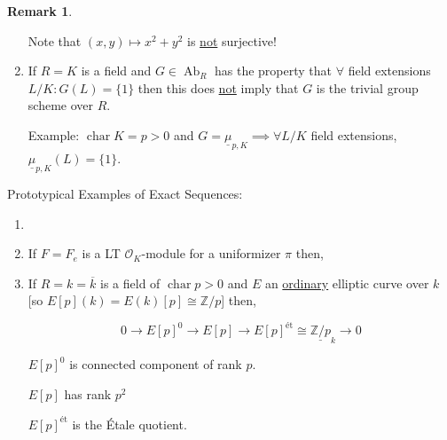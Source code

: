 \documentclass{article}
\theoremstyle{definition}
\numberwithin{theorem}{subsection}
\newtheorem*{remark}{Remark}
\begin{document}
\begin{remark}
\begin{enumerate}[label=\arabic*)]
            Note that \((x,y) \mapsto x^2 + y^2\) is \underline{not} surjective!

            \item If \(R = K\) is a field and \(G \in \operatorname{Ab}_R\) has the property that \(\forall \) field extensions \(L / K: G(L) = \{ 1 \}\) then this does \underline{not} imply that \(G\) is the trivial group scheme over \(R\).
            
            Example: \(\operatorname{char} K = p > 0\) and \(G = \underline{\mu}_{p,K} \implies \forall L / K\) field extensions, \(\underline{\mu}_{p,K}(L) = \{ 1 \}\).
        \end{enumerate} 

        Prototypical Examples of Exact Sequences: 

        \begin{enumerate}[label=\arabic*)]
            \item
            \begin{center}
            \end{center}
            \item If \(F = F_e\) is a LT \(\mathcal{O}_K\)-module for a uniformizer \(\pi\) then,
            \begin{center}
            \end{center}
            \item If \(R = k = \overline{k}\) is a field of \(\operatorname{char} p > 0\) and \(E\) an \underline{ordinary} elliptic curve over \(k\) [so \(E[p](k) = E(k)[p] \cong \mathbb{Z} / p\)] then,
            
            \[
                0 \to E[p]^0 \to E[p] \to E[p]^{\text{\'et}} \cong \underline{\mathbb{Z} / p}_k \to 0 
            \]

            \(E[p]^0\) is connected component of rank \(p\).

            \(E[p]\) has rank \(p^2\) 

            \(E[p]^{\text{\'et}}\) is the \'Etale quotient. 
        \end{enumerate} 
    \end{remark}
\end{document}

